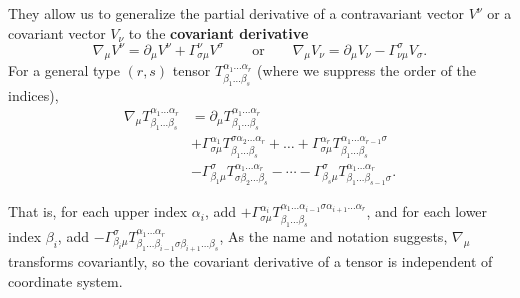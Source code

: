 \documentclass[a4paper,11pt,twoside]{report}
\begin{document}
They allow us to generalize the partial derivative of a contravariant vector $V^\nu$ or a covariant vector $V_\nu$ to the \textbf{covariant derivative}
\begin{equation*}
	\nabla_\mu V^\nu = \partial_\mu V^\nu + \Gamma_{\sigma \mu}^\nu V^\sigma
	\qquad \text{or} \qquad
	\nabla_\mu V_\nu = \partial_\mu V_\nu - \Gamma_{\nu \mu}^\sigma V_\sigma
	.
\end{equation*}
For a general type $(r,s)$ tensor $T^{\alpha_1 \ldots \alpha_r}_{\beta_1 \ldots \beta_s}$ (where we suppress the order of the indices),
\begin{equation}
\begin{split}
	\nabla_\mu T^{\alpha_1 \ldots \alpha_r}_{\beta_1 \ldots \beta_s} &= \partial_\mu T^{\alpha_1 \ldots \alpha_r}_{\beta_1 \ldots \beta_s} \\
	                                                                 &+ \Gamma^{\alpha_1}_{\sigma\mu} T^{\sigma \alpha_2 \ldots \alpha_r}_{\beta_1 \ldots \beta_s} + \dots + \Gamma^{\alpha_r}_{\sigma\mu} T^{\alpha_1 \ldots \alpha_{r-1}\sigma}_{\beta_1 \ldots \beta_s} \\
	                                                                 &- \Gamma^\sigma_{\beta_1 \mu} T^{\alpha_1 \ldots \alpha_r}_{\sigma \beta_2 \ldots \beta_s} - \cdots - \Gamma^\sigma_{\beta_s \mu} T^{\alpha_1 \ldots \alpha_r}_{\beta_1 \ldots \beta_{s-1} \sigma}.
	\label{eq:def_cov_deriv}
\end{split}
\end{equation}
\iffalse
\begin{align}
	\nabla_c T\indices{^{a_1 \ldots a_r}_{b_1 \ldots b_s}} &= \partial_c {T^{a_1 \ldots a_r}}_{b_1 \ldots b_s} \\
	                                                       &+ \Gamma^{a_1}_{dc} T\indices{^{d a_2 \ldots a_r}_{b_1 \ldots b_s}} + \dots + \Gamma^{a_r}_{dc} T\indices{^{a_1 \ldots a_{r-1}d}_{b_1 \ldots b_s}} \\
	                                                       &- {\Gamma^d}_{b_1 c} {T^{a_1 \ldots a_r}}_{d b_2 \ldots b_s} - \cdots - {\Gamma^d}_{b_s c} {T^{a_1 \ldots a_r}}_{b_1 \ldots b_{s-1} d}.
	\label{eq:def_cov_deriv}
\end{align}
\fi
That is, for each upper index $\alpha_i$, add $+\Gamma^{\alpha_i}_{\sigma \mu} T^{\alpha_1 \ldots \alpha_{i-1} \sigma \alpha_{i+1} \ldots \alpha_r}_{\beta_1 \ldots \beta_s}$,
and for each lower index $\beta_i$, add $-\Gamma^{\sigma}_{\beta_i \mu} T^{\alpha_1 \ldots \alpha_r}_{\beta_1 \ldots \beta_{i-1} \sigma \beta_{i+1} \ldots \beta_s}$,
As the name and notation suggests, $\nabla_\mu$ transforms covariantly, so the covariant derivative of a tensor is independent of coordinate system.
\end{document}
